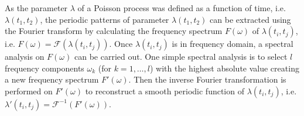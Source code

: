 As the parameter $\lambda$ of a Poisson process was defined as a function of time, i.e. $\lambda(t_1, t_2)$, the periodic patterns of parameter $\lambda(t_1, t_2)$ can be extracted using the Fourier transform by calculating the frequency spectrum $F(\omega)$ of $\lambda(t_i, t_j)$, i.e. $F(\omega) = \mathcal F(\lambda(t_i, t_j))$. Once $\lambda(t_i, t_j)$ is in frequency domain, a spectral analysis on $F(\omega)$ can be carried out. One simple spectral analysis is to select $l$ frequency components $\omega_k$ (for $k=1,\ldots,l$) with the highest absolute value creating a new frequency spectrum $F'(\omega)$. Then the inverse Fourier transformation is performed on $F'(\omega)$ to reconstruct a smooth periodic function of $\lambda(t_i, t_j)$, i.e. $\lambda'(t_i, t_j) = \mathcal F^{-1}(F'(\omega))$.
